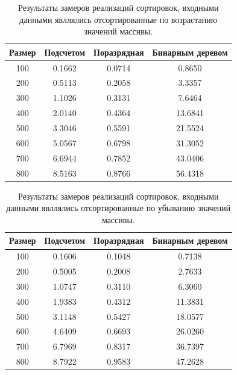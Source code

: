 \begin{table}[ht!]
	\begin{center}
			\captionsetup{justification=raggedleft,singlelinecheck=off}
			\caption{Результаты замеров реализаций сортировок, входными данными явллялись отсортированные по возрастанию значений массивы.}
			\label{tbl:best}
			\begin{tabular}{|c|c|c|c|}
				\hline
				Размер & Подсчетом &  Поразрядная &  Бинарным деревом \\
				\hline
				100 & 0.1662 & 0.0714 & 0.8650 \\ 
				\hline
				200 & 0.5113 & 0.2058 & 3.3357 \\ 
				\hline
				300 & 1.1026 & 0.3131 & 7.6464 \\ 
				\hline
				400 & 2.0140 & 0.4364 & 13.6841 \\ 
				\hline
				500 & 3.3046 & 0.5591 & 21.5524 \\ 
				\hline
				600 & 5.0567 & 0.6798 & 31.3052 \\ 
				\hline
				700 & 6.6944 & 0.7852 & 43.0406 \\ 
				\hline
				800 & 8.5163 & 0.8766 & 56.4318 \\ 
				\hline
			\end{tabular}
	\end{center}
\end{table}


\begin{table}[ht!]
	\begin{center}
			\captionsetup{justification=raggedleft,singlelinecheck=off}
			\caption{Результаты замеров реализаций сортировок, входными данными явллялись отсортированные по убыванию значений массивы.}
			\label{tbl:worth}
			\begin{tabular}{|c|c|c|c|}
				\hline
				Размер & Подсчетом &  Поразрядная &  Бинарным деревом \\
				\hline
				100 & 0.1606 & 0.1048 & 0.7138 \\ 
				\hline
				200 & 0.5005 & 0.2008 & 2.7633 \\ 
				\hline
				300 & 1.0747 & 0.3110 & 6.3060 \\ 
				\hline
				400 & 1.9383 & 0.4312 & 11.3831 \\ 
				\hline
				500 & 3.1148 & 0.5427 & 18.0577 \\ 
				\hline
				600 & 4.6409 & 0.6693 & 26.0260 \\ 
				\hline
				700 & 6.7969 & 0.8317 & 36.7397 \\ 
				\hline
				800 & 8.7922 & 0.9583 & 47.2628 \\ 
				\hline
			\end{tabular}
	\end{center}
\end{table}

